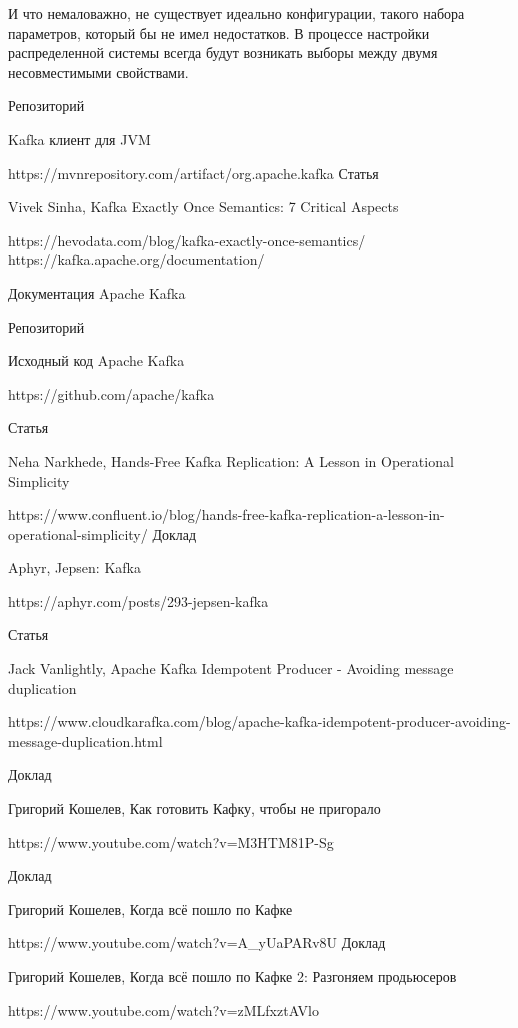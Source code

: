 \documentclass[11pt]{article}
\begin{document}
    И что немаловажно, не существует идеально конфигурации, такого набора параметров, который бы не имел недостатков.
    В процессе настройки распределенной системы всегда будут возникать выборы между двумя несовместимыми
    свойствами.
    \begin{thebibliography}{name}
        Репозиторий

        Kafka клиент для JVM

        https://mvnrepository.com/artifact/org.apache.kafka
        Статья

        Vivek Sinha, Kafka Exactly Once Semantics: 7 Critical Aspects

        https://hevodata.com/blog/kafka-exactly-once-semantics/
         https://kafka.apache.org/documentation/

        Документация Apache Kafka

        Репозиторий

        Исходный код Apache Kafka

        https://github.com/apache/kafka

        Статья

        Neha Narkhede, Hands-Free Kafka Replication: A Lesson in Operational Simplicity

        https://www.confluent.io/blog/hands-free-kafka-replication-a-lesson-in-operational-simplicity/
        Доклад

        Aphyr, Jepsen: Kafka

        https://aphyr.com/posts/293-jepsen-kafka


        Статья

        Jack Vanlightly, Apache Kafka Idempotent Producer - Avoiding message duplication

        https://www.cloudkarafka.com/blog/apache-kafka-idempotent-producer-avoiding-message-duplication.html


        Доклад

        Григорий Кошелев, Как готовить Кафку, чтобы не пригорало

        https://www.youtube.com/watch?v=M3HTM81P-Sg

        Доклад

        Григорий Кошелев, Когда всё пошло по Кафке

        https://www.youtube.com/watch?v=A\_yUaPARv8U
        Доклад

        Григорий Кошелев, Когда всё пошло по Кафке 2: Разгоняем продьюсеров

        https://www.youtube.com/watch?v=zMLfxztAVlo
    \end{thebibliography}
\end{document}
